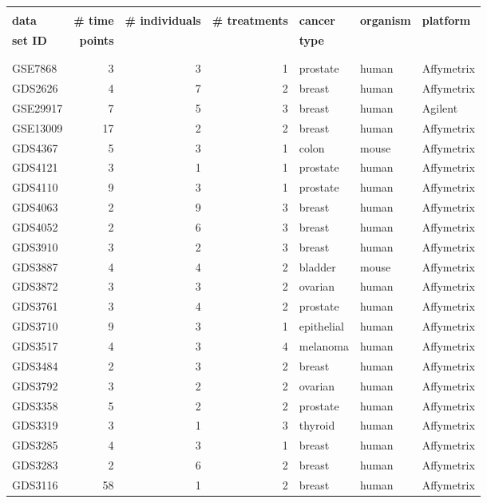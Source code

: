 \begin{table}
{\scriptsize
\begin{tabular}{lrrrlll}
\hline
& & & & & & \\
\textbf{data}	&	\textbf{\# time}	&	\textbf{\# individuals}	&	\textbf{\# treatments}	&	\textbf{cancer}	&	\textbf{organism}	&	\textbf{platform}	\\
\textbf{set ID}	&	\textbf{points}	&		&	&	\textbf{type}	&		& \\
& & & & & &
\\
\hline
& & & & & &
\\
GSE7868	&	3	&	3	&	1	&	prostate	&	human	&	Affymetrix	\\
GDS2626	&	4	&	7	&	2	&	breast	&	human	&	Affymetrix	\\
GSE29917	&	7	&	5	&	3	&	breast	&	human	&	Agilent	\\
GSE13009	&	17	&	2	&	2	&	breast	&	human	&	Affymetrix	\\
GDS4367	&	5	&	3	&	1	&	colon	&	mouse	&	Affymetrix	\\
GDS4121	&	3	&	1	&	1	&	prostate	&	human 	&	Affymetrix	\\
GDS4110	&	9	&	3	&	1	&	prostate	&	human	&	Affymetrix	\\
GDS4063	&	2	&	9	&	3	&	breast	&	human	&	Affymetrix	\\
GDS4052	&	2	&	6	&	3	&	breast	&	human	&	Affymetrix	\\
GDS3910	&	3	&	2	&	3	&	breast	&	human	&	Affymetrix	\\
GDS3887	&	4	&	4	&	2	&	bladder	&	mouse	&	Affymetrix	\\
GDS3872	&	3	&	3	&	2	&	ovarian	&	human	&	Affymetrix	\\
GDS3761	&	3	&	4	&	2	&	prostate	&	human	&	Affymetrix	\\
GDS3710	&	9	&	3	&	1	&	epithelial	&	human	&	Affymetrix	\\
GDS3517	&	4	&	3	&	4	&	melanoma	&	human	&	Affymetrix	\\
GDS3484	&	2	&	3	&	2	&	breast	&	human	&	Affymetrix	\\
GDS3792	&	3	&	2	&	2	&	ovarian	&	human	&	Affymetrix	\\
GDS3358	&	5	&	2	&	2	&	prostate	&	human	&	Affymetrix	\\
GDS3319	&	3	&	1	&	3	&	thyroid	&	human	&	Affymetrix	\\
GDS3285	&	4	&	3	&	1	&	breast	&	human 	&	Affymetrix	\\
GDS3283	&	2	&	6	&	2	&	breast	&	human	&	Affymetrix	\\
GDS3116	&	58	&	1	&	2	&	breast	&	human	&	Affymetrix	\\

\end{tabular}}
\end{table}
